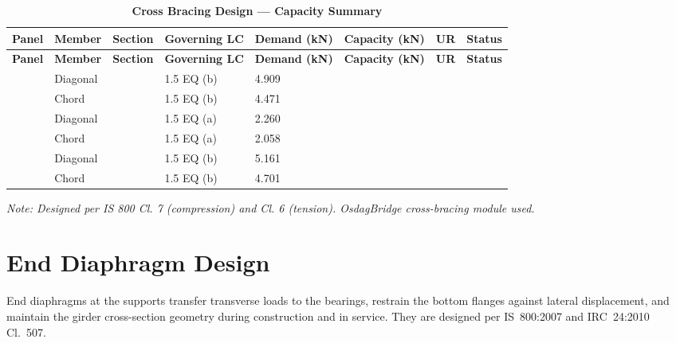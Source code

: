 \documentclass[12pt,a4paper]{report}
\newcommand{\ReportCompactTable}{\setlength{\tabcolsep}{3.5pt}}
\newcommand{\ReportLeftAlignedLongTable}{\setlength{\LTleft}{0pt}\setlength{\LTright}{\fill}}
\numberwithin{table}{chapter}
\numberwithin{figure}{chapter}
\begin{document}
\vspace{1em}
\begin{longtable}{|C{2.0cm}|L{1.8cm}|C{2.2cm}|C{3.0cm}|C{1.8cm}|C{1.8cm}|C{1.2cm}|C{1.8cm}|}
\caption{\textbf{Cross Bracing Design --- Capacity Summary}}
\hline
\textbf{Panel} & \textbf{Member} & \textbf{Section} & \textbf{Governing LC} & \textbf{Demand (kN)} & \textbf{Capacity (kN)} & \textbf{UR} & \textbf{Status} \\[6pt]
\hline
\endfirsthead
\textbf{Panel} & \textbf{Member} & \textbf{Section} & \textbf{Governing LC} & \textbf{Demand (kN)} & \textbf{Capacity (kN)} & \textbf{UR} & \textbf{Status} \\[6pt]
\hline
\endhead
{} & Diagonal &  & 1.5 EQ (b) & 4.909 &  &  &  \\[6pt]
 & Chord &  & 1.5 EQ (b) & 4.471 &  &  &  \\[6pt]
\hline
{} & Diagonal &  & 1.5 EQ (a) & 2.260 &  &  &  \\[6pt]
 & Chord &  & 1.5 EQ (a) & 2.058 &  &  &  \\[6pt]
\hline
{} & Diagonal &  & 1.5 EQ (b) & 5.161 &  &  &  \\[6pt]
 & Chord &  & 1.5 EQ (b) & 4.701 &  &  &  \\[6pt]
\hline
\end{longtable}
\noindent\textit{Note: Designed per IS 800 Cl. 7 (compression) and Cl. 6 (tension). OsdagBridge cross-bracing module used.}

\section{End Diaphragm Design}
\label{sec:end-diaphragm}

End diaphragms at the supports transfer transverse loads to the bearings, restrain the bottom flanges against lateral displacement, and maintain the girder cross-section geometry during construction and in service. They are designed per IS~800:2007 and IRC~24:2010 Cl.~507.

\vspace{1em}

\vspace{0.4em}
\noindent
\ReportCompactTable
\ReportLeftAlignedLongTable
\end{document}
